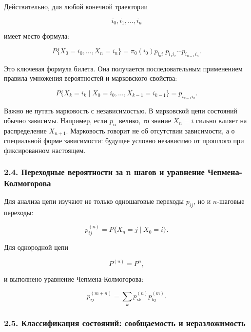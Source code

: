 \documentclass[
  11pt,
  a4paper,
]{article}
\begin{document}
Действительно, для любой конечной траектории

\[
i_0,i_1,\ldots,i_n
\]

имеет место формула:

\[
P\{X_0=i_0,\ldots,X_n=i_n\}
=
\pi_0(i_0)p_{i_0i_1}p_{i_1i_2}\cdots p_{i_{n-1}i_n}.
\]

Это ключевая формула билета. Она получается последовательным применением
правила умножения вероятностей и марковского свойства:

\[
P\{X_k=i_k\mid X_0=i_0,\ldots,X_{k-1}=i_{k-1}\}
=
p_{i_{k-1}i_k}.
\]

Важно не путать марковость с независимостью. В марковской цепи состояний
обычно зависимы. Например, если \(p_{ii}\) велико, то знание \(X_n=i\)
сильно влияет на распределение \(X_{n+1}\). Марковость говорит не об
отсутствии зависимости, а о специальной форме зависимости: будущее
условно независимо от прошлого при фиксированном настоящем.

\subsubsection{2.4. Переходные вероятности за n шагов и уравнение
Чепмена-Колмогорова}\label{ux43fux435ux440ux435ux445ux43eux434ux43dux44bux435-ux432ux435ux440ux43eux44fux442ux43dux43eux441ux442ux438-ux437ux430-n-ux448ux430ux433ux43eux432-ux438-ux443ux440ux430ux432ux43dux435ux43dux438ux435-ux447ux435ux43fux43cux435ux43dux430-ux43aux43eux43bux43cux43eux433ux43eux440ux43eux432ux430}

Для анализа цепи изучают не только одношаговые переходы \(p_{ij}\), но и
\(n\)-шаговые переходы:

\[
p_{ij}^{(n)}=P\{X_n=j\mid X_0=i\}.
\]

Для однородной цепи

\[
P^{(n)}=P^n,
\]

и выполнено уравнение Чепмена-Колмогорова:

\[
p_{ij}^{(m+n)}
=
\sum_kp_{ik}^{(n)}p_{kj}^{(m)}.
\]

\subsubsection{2.5. Классификация состояний: сообщаемость и
неразложимость}\label{ux43aux43bux430ux441ux441ux438ux444ux438ux43aux430ux446ux438ux44f-ux441ux43eux441ux442ux43eux44fux43dux438ux439-ux441ux43eux43eux431ux449ux430ux435ux43cux43eux441ux442ux44c-ux438-ux43dux435ux440ux430ux437ux43bux43eux436ux438ux43cux43eux441ux442ux44c}
\end{document}
